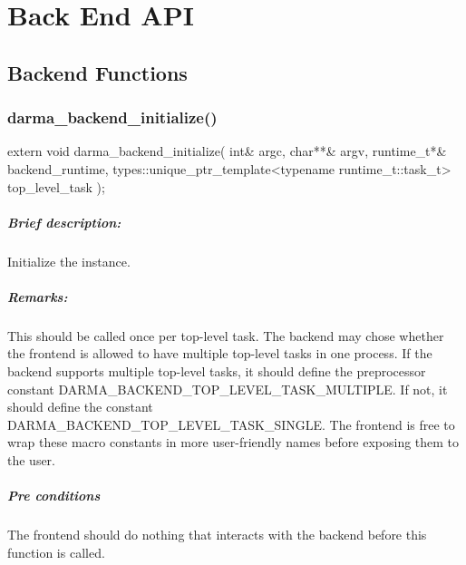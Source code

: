 
\chapter{Back End API}
\label{chap:back_end}


\section{Backend Functions}

\subsection{darma\_backend\_initialize()}
\begin{CppCode}
extern void
darma_backend_initialize(
  int& argc, char**& argv,
  runtime_t*& backend_runtime,
  types::unique_ptr_template<typename runtime_t::task_t> top_level_task
);
\end{CppCode}

\paragraph{Brief description:} Initialize the  instance.
 
\paragraph{Remarks:} This should be called once per top-level task.  The backend may chose whether
  the frontend is allowed to have multiple top-level tasks in one process.  If the backend
   supports multiple top-level tasks, it should define the preprocessor constant
   DARMA\_BACKEND\_TOP\_LEVEL\_TASK\_MULTIPLE.  If not, it should define the constant
   DARMA\_BACKEND\_TOP\_LEVEL\_TASK\_SINGLE.  The frontend is free to wrap these macro constants
   in more user-friendly names before exposing them to the user.
 
\paragraph{Pre conditions} The frontend should do nothing that interacts with the backend before this
   function is called.
 
